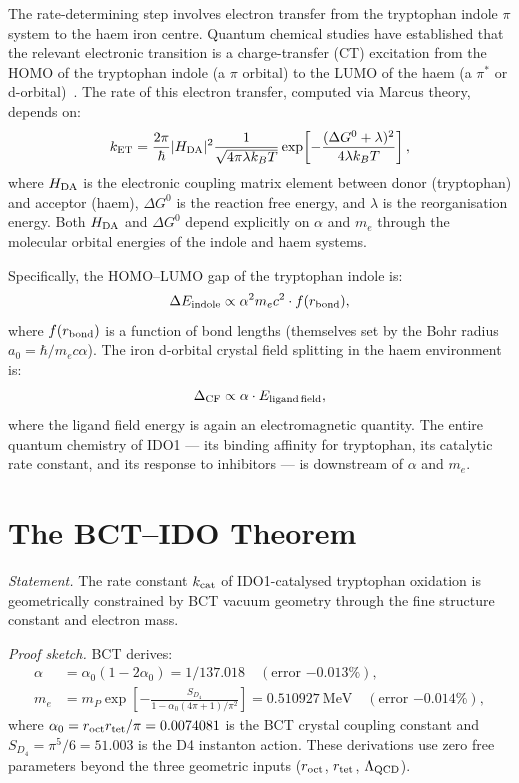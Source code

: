 \documentclass[aps,prl,preprint,superscriptaddress,floatfix]{revtex4-2}
\begin{document}
The rate-determining step involves electron transfer from the tryptophan
indole $\pi$ system to the haem iron centre. Quantum chemical studies have
established that the relevant electronic transition is a charge-transfer
(CT) excitation from the HOMO of the tryptophan indole (a $\pi$ orbital)
to the LUMO of the haem (a $\pi^*$ or d-orbital)~\cite{suess2017}. The
rate of this electron transfer, computed via Marcus theory, depends on:
\begin{equation}
k_{\rm ET} = \frac{2\pi}{\hbar} |H_{\rm DA}|^2 \frac{1}{\sqrt{4\pi\lambda k_BT}}
\exp\!\left[-\frac{(\Delta G^0 + \lambda)^2}{4\lambda k_BT}\right],
\end{equation}
where $H_{\rm DA}$ is the electronic coupling matrix element between
donor (tryptophan) and acceptor (haem), $\Delta G^0$ is the reaction free
energy, and $\lambda$ is the reorganisation energy. Both $H_{\rm DA}$ and
$\Delta G^0$ depend explicitly on $\alpha$ and $m_e$ through the molecular
orbital energies of the indole and haem systems.

Specifically, the HOMO--LUMO gap of the tryptophan indole is:
\begin{equation}
\Delta E_{\rm indole} \propto \alpha^2 m_e c^2 \cdot f(r_{\rm bond}),
\end{equation}
where $f(r_{\rm bond})$ is a function of bond lengths (themselves set by
the Bohr radius $a_0 = \hbar/m_e c\alpha$). The iron d-orbital crystal
field splitting in the haem environment is:
\begin{equation}
\Delta_{\rm CF} \propto \alpha \cdot E_{\rm ligand\,field},
\end{equation}
where the ligand field energy is again an electromagnetic quantity. The
entire quantum chemistry of IDO1 --- its binding affinity for tryptophan,
its catalytic rate constant, and its response to inhibitors --- is
downstream of $\alpha$ and $m_e$.

\section{The BCT--IDO Theorem}

\textit{Statement.} The rate constant $k_{\rm cat}$ of IDO1-catalysed
tryptophan oxidation is geometrically constrained by BCT vacuum geometry
through the fine structure constant and electron mass.

\textit{Proof sketch.} BCT derives:
\begin{align}
\alpha &= \alpha_0(1 - 2\alpha_0) = 1/137.018
  \quad (\text{error } {-0.013\%}), \\
m_e &= m_P \exp\!\left[-\frac{S_{D_4}}{1 - \alpha_0(4\pi+1)/\pi^2}\right]
  = 0.510927~\text{MeV}
  \quad (\text{error } {-0.014\%}),
\end{align}
where $\alpha_0 = r_{\rm oct} r_{\rm tet}/\pi = 0.0074081$ is the BCT
crystal coupling constant and $S_{D_4} = \pi^5/6 = 51.003$ is the D4
instanton action. These derivations use zero free parameters beyond the
three geometric inputs ($r_{\rm oct}$, $r_{\rm tet}$, $\Lambda_{\rm QCD}$).
\end{document}
